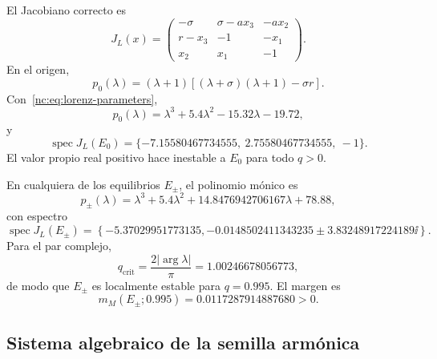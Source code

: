 El Jacobiano correcto es
\begin{equation}
 J_L(x)=
 \begin{pmatrix}
 -\sigma&\sigma-a x_3&-a x_2\\
 r-x_3&-1&-x_1\\
 x_2&x_1&-1
 \end{pmatrix}.
 \label{nc:eq:lorenz-jacobian}
\end{equation}
En el origen,
\begin{equation}
 p_0(\lambda)
 =(\lambda+1)\left[(\lambda+\sigma)(\lambda+1)-\sigma r\right].
\end{equation}
Con~\eqref{nc:eq:lorenz-parameters},
\begin{equation}
 p_0(\lambda)=
 \lambda^3+5.4\lambda^2-15.32\lambda-19.72,
\end{equation}
y
\begin{equation}
 \operatorname{spec}J_L(E_0)=
 \{-7.15580467734555,\ 2.75580467734555,\ -1\}.
 \label{nc:eq:lorenz-origin-spectrum}
\end{equation}
El valor propio real positivo hace inestable a \(E_0\) para todo \(q>0\).

En cualquiera de los equilibrios \(E_{\pm}\), el polinomio mónico es
\begin{equation}
 p_{\pm}(\lambda)=
 \lambda^3+5.4\lambda^2
 +14.8476942706167\lambda+78.88,
\end{equation}
con espectro
\begin{equation}
 \operatorname{spec}J_L(E_{\pm})=
 \left\{
 -5.37029951773135,
 -0.0148502411343235\pm3.83248917224189\ii
 \right\}.
 \label{nc:eq:lorenz-outer-spectrum}
\end{equation}
Para el par complejo,
\begin{equation}
 q_{\mathrm{crit}}=
 \frac{2|\arg\lambda|}{\pi}=1.00246678056773,
\end{equation}
de modo que \(E_{\pm}\) es localmente estable para \(q=0.995\). El margen es
\begin{equation}
 m_M(E_{\pm};0.995)=0.0117287914887680>0.
\end{equation}

\subsection{Sistema algebraico de la semilla armónica}

